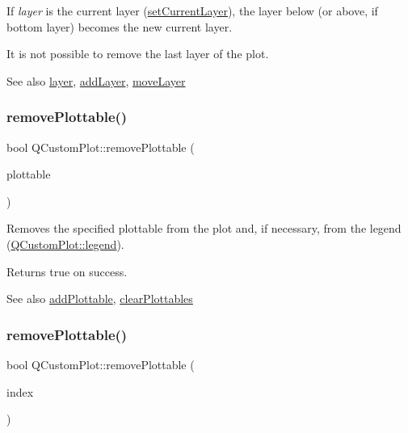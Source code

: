 If {\itshape layer} is the current layer (\hyperlink{class_q_custom_plot_a73a6dc47c653bb6f8f030abca5a11852}{set\+Current\+Layer}), the layer below (or above, if bottom layer) becomes the new current layer.

It is not possible to remove the last layer of the plot.

\begin{DoxySeeAlso}{See also}
\hyperlink{class_q_custom_plot_a0a96244e7773b242ef23c32b7bdfb159}{layer}, \hyperlink{class_q_custom_plot_ad5255393df078448bb6ac83fa5db5f52}{add\+Layer}, \hyperlink{class_q_custom_plot_ae896140beff19424e9e9e02d6e331104}{move\+Layer} 
\end{DoxySeeAlso}
\hypertarget{class_q_custom_plot_af3dafd56884208474f311d6226513ab2}{}\label{class_q_custom_plot_af3dafd56884208474f311d6226513ab2} 
\subsubsection{\texorpdfstring{remove\+Plottable()}{removePlottable()}\hspace{0.1cm}{\footnotesize\ttfamily [1/2]}}
{\footnotesize\ttfamily bool Q\+Custom\+Plot\+::remove\+Plottable (\begin{DoxyParamCaption}\item[{\hyperlink{class_q_c_p_abstract_plottable}{Q\+C\+P\+Abstract\+Plottable} $\ast$}]{plottable }\end{DoxyParamCaption})}

Removes the specified plottable from the plot and, if necessary, from the legend (\hyperlink{class_q_custom_plot_a4eadcd237dc6a09938b68b16877fa6af}{Q\+Custom\+Plot\+::legend}).

Returns true on success.

\begin{DoxySeeAlso}{See also}
\hyperlink{class_q_custom_plot_ab7ad9174f701f9c6f64e378df77927a6}{add\+Plottable}, \hyperlink{class_q_custom_plot_a9a409bb3201878adb7ffba1c89c4e004}{clear\+Plottables} 
\end{DoxySeeAlso}
\hypertarget{class_q_custom_plot_afc210e0021480f8119bccf37839dbcc8}{}\label{class_q_custom_plot_afc210e0021480f8119bccf37839dbcc8} 
\subsubsection{\texorpdfstring{remove\+Plottable()}{removePlottable()}\hspace{0.1cm}{\footnotesize\ttfamily [2/2]}}
{\footnotesize\ttfamily bool Q\+Custom\+Plot\+::remove\+Plottable (\begin{DoxyParamCaption}\item[{int}]{index }\end{DoxyParamCaption})}

